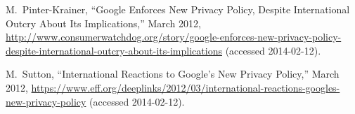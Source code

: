 \documentclass[conference]{IEEEtran}
\begin{document}
\begin{thebibliography}{99}
M.~Pinter-Krainer, ``{Google Enforces New Privacy Policy, Despite International
  Outcry About Its Implications},'' March 2012,
  \url{http://www.consumerwatchdog.org/story/google-enforces-new-privacy-policy-despite-international-outcry-about-its-implications}
  (accessed 2014-02-12).

M.~Sutton, ``{International Reactions to Google’s New Privacy Policy},''
  March 2012,
  \url{https://www.eff.org/deeplinks/2012/03/international-reactions-googles-new-privacy-policy}
  (accessed 2014-02-12).

\end{thebibliography}



\end{document}
